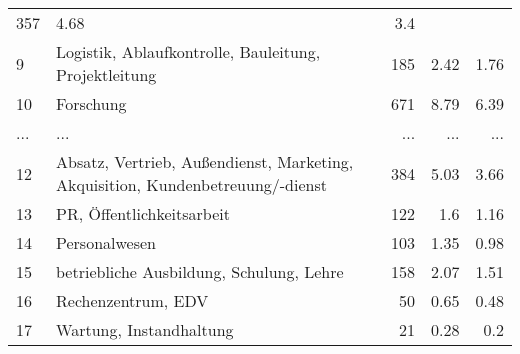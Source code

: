 \begin{longtable}{lXrrr}
          \num{357} &
          \num[round-mode=places,round-precision=2]{4.68} &
          \num[round-mode=places,round-precision=2]{3.4} \\
        9 & \multicolumn{1}{X}{Logistik, Ablaufkontrolle, Bauleitung, Projektleitung} & %
          \num{185} &
          \num[round-mode=places,round-precision=2]{2.42} &
          \num[round-mode=places,round-precision=2]{1.76} \\
        10 & \multicolumn{1}{X}{Forschung} & %
          \num{671} &
          \num[round-mode=places,round-precision=2]{8.79} &
          \num[round-mode=places,round-precision=2]{6.39} \\
       ... & ... & ... & ... & ... \\
        12 & \multicolumn{1}{X}{Absatz, Vertrieb, Außendienst, Marketing, Akquisition, Kundenbetreuung/-dienst} & %
          \num{384} &
          \num[round-mode=places,round-precision=2]{5.03} &
          \num[round-mode=places,round-precision=2]{3.66} \\

        13 & \multicolumn{1}{X}{PR, Öffentlichkeitsarbeit} & %
          \num{122} &
          \num[round-mode=places,round-precision=2]{1.6} &
          \num[round-mode=places,round-precision=2]{1.16} \\

        14 & \multicolumn{1}{X}{Personalwesen} & %
          \num{103} &
          \num[round-mode=places,round-precision=2]{1.35} &
          \num[round-mode=places,round-precision=2]{0.98} \\

        15 & \multicolumn{1}{X}{betriebliche Ausbildung, Schulung, Lehre} & %
          \num{158} &
          \num[round-mode=places,round-precision=2]{2.07} &
          \num[round-mode=places,round-precision=2]{1.51} \\

        16 & \multicolumn{1}{X}{Rechenzentrum, EDV} & %
          \num{50} &
          \num[round-mode=places,round-precision=2]{0.65} &
          \num[round-mode=places,round-precision=2]{0.48} \\

        17 & \multicolumn{1}{X}{Wartung, Instandhaltung} & %
          \num{21} &
          \num[round-mode=places,round-precision=2]{0.28} &
          \num[round-mode=places,round-precision=2]{0.2} \\


\end{longtable}
